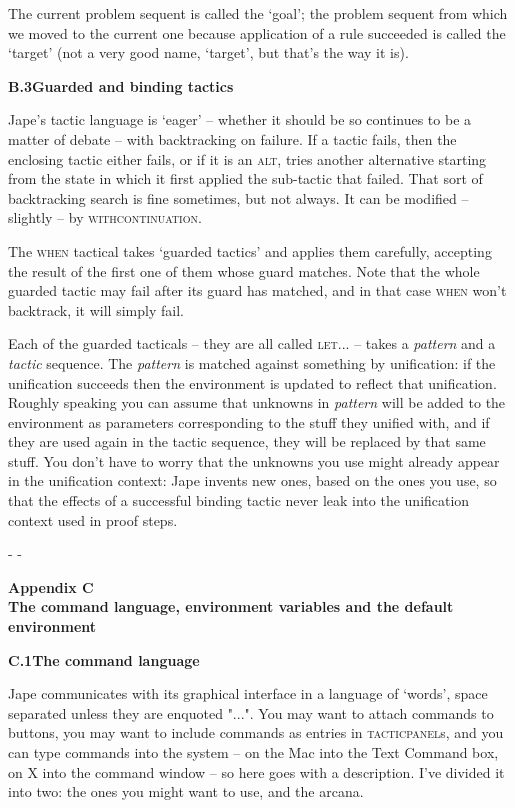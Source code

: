 \documentclass[11pt]{book}
\newcommand{\tab}{\hspace{5mm}}
\begin{document}
The current problem sequent is called the `goal'; the problem sequent from which we moved to the current one because application of a rule succeeded is called the `target' (not a very good name, `target', but that's the way it is).


\textbf{{\large B.3\tab Guarded and binding tactics}}


Jape's tactic language is `eager' -- whether it should be so continues to be a matter of debate -- with backtracking on failure. If a tactic fails, then the enclosing tactic either fails, or if it is an \textsc{alt}, tries another alternative starting from the state in which it first applied the sub-tactic that failed. That sort of backtracking search is fine sometimes, but not always. It can be modified -- slightly -- by \textsc{withcontinuation}.


The \textsc{when} tactical takes `guarded tactics' and applies them carefully, accepting the result of the first one of them whose guard matches. Note that the whole guarded tactic may fail after its guard has matched, and in that case \textsc{when} won't backtrack, it will simply fail.


Each of the guarded tacticals -- they are all called \textsc{let...} -- takes a \textit{pattern} and a \textit{tactic} sequence. The \textit{pattern} is matched against something by unification: if the unification succeeds then the environment is updated to reflect that unification. Roughly speaking you can assume that unknowns in \textit{pattern} will be added to the environment as parameters corresponding to the stuff they unified with, and if they are used again in the tactic sequence, they will be replaced by that same stuff. You don't have to worry that the unknowns you use might already appear in the unification context: Jape invents new ones, based on the ones you use, so that the effects of a successful binding tactic never leak into the unification context used in proof steps.




\begin{center} -  -


\end{center} \textbf{{\huge Appendix C\\
The command language, environment variables and the default environment}}


\textbf{{\large C.1\tab The command language}}


Jape communicates with its graphical interface in a language of `words', space separated unless they are enquoted "...". You may want to attach commands to buttons, you may want to include commands as entries in \textsc{tacticpanel}s, and you can type commands into the system -- on the Mac into the Text Command box, on X into the command window -- so here goes with a description. I've divided it into two: the ones you might want to use, and the arcana.
\end{document}
